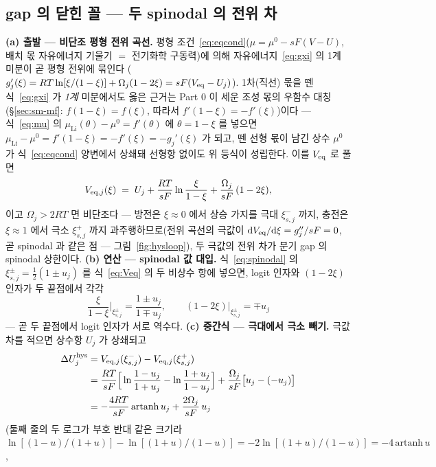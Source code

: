 \subsection{gap 의 닫힌 꼴 --- 두 spinodal 의 전위 차}\label{sec:hys-gap}
\textbf{(a) 출발 --- 비단조 평형 전위 곡선.} 평형 조건~\eqref{eq:eqcond}($\mu=\mu^0-sF(V-U)$, 배치 몫 자유에너지 기울기 $=$ 전기화학 구동력)에 의해 자유에너지~\eqref{eq:gxi} 의 1계 미분이 곧 평형 전위에 묶인다
($g_j'(\xi)=RT\ln[\xi/(1-\xi)]+\Omega_j(1-2\xi)=sF(V_{\mathrm{eq}}-U_j)$). 1차(직선) 몫을 뗀 식~\eqref{eq:gxi} 가 \emph{1계} 미분에서도
옳은 근거는 Part 0 이 세운 조성 몫의 우함수 대칭(\S\ref{sec:sm-mf}: $f(1-\xi)=f(\xi)$, 따라서 $f'(1-\xi)=-f'(\xi)$)이다
--- 식~\eqref{eq:mu} 의 $\mu_\mathrm{Li}(\theta)-\mu^0=f'(\theta)$
에 $\theta=1-\xi$ 를 넣으면 $\mu_\mathrm{Li}-\mu^0=f'(1-\xi)=-f'(\xi)=-g_j'(\xi)$ 가 되고, 뗀 선형 몫이 남긴 상수 $\mu^0$ 가
식~\eqref{eq:eqcond} 양변에서 상쇄돼 선형항 없이도 위 등식이 성립한다. 이를 $V_{\mathrm{eq}}$ 로 풀면
\begin{equation}
V_{\mathrm{eq},j}(\xi)\;=\;U_j+\frac{RT}{sF}\ln\frac{\xi}{1-\xi}+\frac{\Omega_j}{sF}\,(1-2\xi),
\label{eq:Veq}
\end{equation}
이고 $\Omega_j>2RT$ 면 비단조다 --- 방전은 $\xi\!\approx\!0$ 에서 상승 가지를 극대 $\xi_{s,j}^-$ 까지, 충전은 $\xi\!\approx\!1$
에서 극소 $\xi_{s,j}^+$ 까지 과주행하므로(전위 곡선의 극값이 $\mathrm{d} V_{\mathrm{eq}}/\mathrm{d}\xi=g_j''/sF=0$, 곧 spinodal 과 같은 점 ---
그림~\ref{fig:hysloop}), 두 극값의 전위 차가 분기 gap 의 spinodal 상한이다. \textbf{(b) 연산 --- spinodal 값 대입.}
식~\eqref{eq:spinodal} 의 $\xi_{s,j}^\pm=\tfrac12(1\pm u_j)$ 를 식~\eqref{eq:Veq} 의 두 비상수 항에 넣으면, logit 인자와
$(1-2\xi)$ 인자가 두 끝점에서 각각
\begin{equation}
\frac{\xi}{1-\xi}\bigg|_{\xi_{s,j}^\pm}=\frac{1\pm u_j}{1\mp u_j},
\qquad
(1-2\xi)\big|_{\xi_{s,j}^\pm}=\mp u_j
\label{eq:hyssub}
\end{equation}
--- 곧 두 끝점에서 logit 인자가 서로 역수다. \textbf{(c) 중간식 --- 극대에서 극소 빼기.} 극값 차를 적으면 상수항 $U_j$ 가
상쇄되고
\begin{align}
\Delta U_j^{\mathrm{hys}}
&=V_{\mathrm{eq},j}(\xi_{s,j}^-)-V_{\mathrm{eq},j}(\xi_{s,j}^+)\notag\\
&=\frac{RT}{sF}\Big[\ln\frac{1-u_j}{1+u_j}-\ln\frac{1+u_j}{1-u_j}\Big]
+\frac{\Omega_j}{sF}\big[u_j-(-u_j)\big]\notag\\
&=-\frac{4RT}{sF}\,\mathrm{artanh}\,u_j+\frac{2\Omega_j}{sF}\,u_j
\label{eq:hysdiff}
\end{align}
(둘째 줄의 두 로그가 부호 반대 같은 크기라 $\ln[(1-u)/(1+u)]-\ln[(1+u)/(1-u)]=-2\ln[(1+u)/(1-u)]=-4\,\mathrm{artanh}\,u$,

